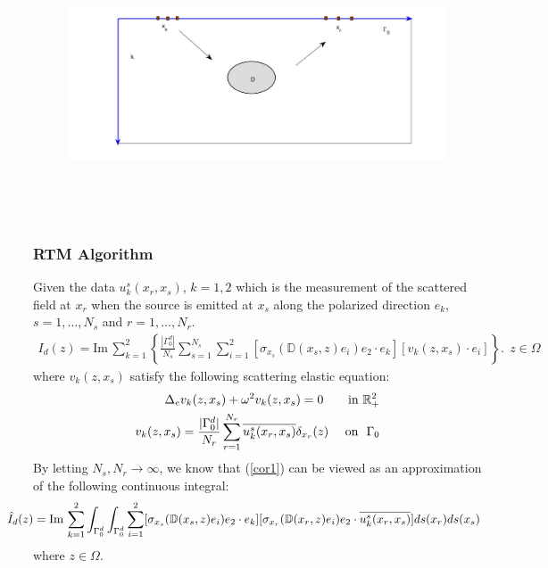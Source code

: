 \documentclass[cjk,8pt]{beamer}
\newcommand{\R}{\mathbb{R}}
\renewcommand{\Im}{\mathrm{Im}\,}
\newcommand{\Ga}{\Gamma}
\newcommand{\Om}{\Omega}
\renewcommand{\Im}{\mathrm{Im}\,}
\newcommand{\D}{\mathbb{D}}
\newcommand{\be}{\begin{eqnarray}}
\newcommand{\ee}{\end{eqnarray}}
\newcommand{\ben}{\begin{eqnarray*}}
\newcommand{\een}{\end{eqnarray*}}
\begin{document}
\begin{CJK*}{GBK}{kai}
\begin{frame}
\begin{figure}
  \centering
  \includegraphics[width=12cm,height=8cm]{./figure/half_forward}
\end{figure}
\end{frame}
\begin{frame}
\frametitle{RTM Algorithm}
Given the data $u_k^s(x_r,x_s)$, $k=1,2$ which is the measurement of the scattered field at $x_r$ when the source is emitted at $x_s$ along the  polarized direction $e_k$, $s=1,\dots, N_s$ and $r=1,\dots,N_r$.
\be\label{cor1}
I_d(z)=\Im\sum_{k=1}^{2}\left\{\frac{|\Gamma_0^d|}{N_s}\sum^{N_s}_{s=1}\sum_{i=1}^{2}[\sigma_{x_s}(\D(x_s,z)e_i)e_2\cdot e_k][v_k(z,x_s)\cdot e_i]\right\}. \ \ z\in \Omega
\ee
where $v_k(z,x_s)$ satisfy the following scattering elastic equation:
\ben
\Delta_e v_k(z,x_s) + \omega^2 v_k(z,x_s) =0 \qquad\mbox{\rm in } \R^2_+ \\
v_k(z,x_s)=\frac{|\Ga_0^d|}{N_r}\sum_{r=1}^{N_r}\overline{u^s_k(x_r,x_s)}\delta_{x_r}(z) \ \ \ \ \mbox{\rm on}  \ \ \Ga_0
\een
By letting $N_s,N_r\to\infty$, we know that (\ref{cor1}) can be viewed as an approximation of the following continuous integral:
\ben\hspace{-0.8cm}
\hat{I}_d(z)=\Im\sum_{k=1}^{2}\int_{\Gamma_0^d}\int_{\Gamma_0^d}\sum_{i=1}^{2}[\sigma_{x_s}(\D(x_s,z)e_i)e_2\cdot e_k]
[\sigma_{x_r}(\D(x_r,z)e_i)e_2\cdot\overline{u^s_k(x_r,x_s)}]ds(x_r)ds(x_s)
\een
where $z\in\Om$.
\end{frame}



\end{CJK*}
\end{document}
